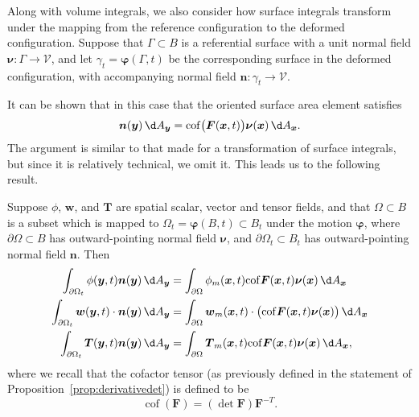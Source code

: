 \documentclass[
  letterpaper,
  DIV=11,
  numbers=noendperiod]{scrreprt}
\theoremstyle{plain}
\theoremstyle{remark}
\begin{document}
Along with volume integrals, we also consider how surface integrals
transform under the mapping from the reference configuration to the
deformed configuration. Suppose that \(\Gamma\subset B\) is a
referential surface with a unit normal field
\({\boldsymbol{\nu}}:\Gamma\to{\mathcal{V}}\), and let
\(\gamma_t = {\boldsymbol{\varphi}}(\Gamma,t)\) be the corresponding
surface in the deformed configuration, with accompanying normal field
\({\boldsymbol{n}}:\gamma_t\to{\mathcal{V}}\).

It can be shown that in this case that the oriented surface area element
satisfies
\[{\boldsymbol{n}}({\boldsymbol{y}}){\,\d A_{{\boldsymbol{y}}}}= {\operatorname{cof}}\big({\boldsymbol{F}}({\boldsymbol{x}},t)\big){\boldsymbol{\nu}}({\boldsymbol{x}}){\,\d A_{{\boldsymbol{x}}}}.\]
The argument is similar to that made for a transformation of surface
integrals, but since it is relatively technical, we omit it. This leads
us to the following result.

Suppose \(\phi\), \({\boldsymbol{w}}\), and \({\boldsymbol{T}}\) are
spatial scalar, vector and tensor fields, and that \(\Omega\subset B\)
is a subset which is mapped to
\(\Omega_t = {\boldsymbol{\varphi}}(B,t)\subset B_t\) under the motion
\({\boldsymbol{\varphi}}\), where \(\partial \Omega\subset B\) has
outward-pointing normal field \({\boldsymbol{\nu}}\), and
\(\partial\Omega_t\subset B_t\) has outward-pointing normal field
\({\boldsymbol{n}}\). Then \[\begin{aligned}
      \int_{\partial\Omega_t}\phi({\boldsymbol{y}},t){\boldsymbol{n}}({\boldsymbol{y}}){\,\d A_{{\boldsymbol{y}}}}&= \int_{\partial\Omega}\phi_m({\boldsymbol{x}},t){\operatorname{cof}}{\boldsymbol{F}}({\boldsymbol{x}},t){\boldsymbol{\nu}}({\boldsymbol{x}}){\,\d A_{{\boldsymbol{x}}}}\\
      \int_{\partial\Omega_t}{\boldsymbol{w}}({\boldsymbol{y}},t)\cdot {\boldsymbol{n}}({\boldsymbol{y}}){\,\d A_{{\boldsymbol{y}}}}&= \int_{\partial\Omega}{\boldsymbol{w}}_m({\boldsymbol{x}},t)\cdot\big({\operatorname{cof}}{\boldsymbol{F}}({\boldsymbol{x}},t){\boldsymbol{\nu}}({\boldsymbol{x}})\big){\,\d A_{{\boldsymbol{x}}}}\\
      \int_{\partial\Omega_t}{\boldsymbol{T}}({\boldsymbol{y}},t){\boldsymbol{n}}({\boldsymbol{y}}){\,\d A_{{\boldsymbol{y}}}}&= \int_{\partial\Omega}{\boldsymbol{T}}_m({\boldsymbol{x}},t){\operatorname{cof}}{\boldsymbol{F}}({\boldsymbol{x}},t){\boldsymbol{\nu}}({\boldsymbol{x}}){\,\d A_{{\boldsymbol{x}}}},
    \end{aligned}\] where we recall that the cofactor tensor (as
previously defined in the statement of
Proposition~\hyperref[prop:derivativedet]{{[}prop:derivativedet{]}}) is
defined to be
\[{\operatorname{cof}}({\boldsymbol{F}}) = (\det{\boldsymbol{F}}){\boldsymbol{F}}^{-T}.\]
\end{document}
